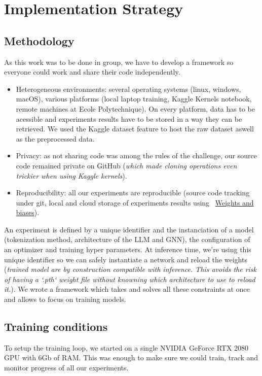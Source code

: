 \section{Implementation Strategy}
\label{sec:remplementation}
\subsection*{Methodology}
\label{sec:methodology}
As this work was to  be done in group, we have to develop a framework so everyone could work and share their code independently.
\begin{itemize}
    \item Heterogeneous environments: several operating systems (linux, windows, macOS), various platforms (local laptop training, Kaggle Kernels notebook, remote machines at Ecole Polytechnique). On every platform, data has to be acessible and experiments results have to be stored in a way they can be retrieved. We used the Kaggle dataset feature to  host the raw dataset aswell as the preprocessed data.
    \item Privacy: as not sharing code was among the rules of the challenge, our source code remained private on GitHub (\textit{which made cloning operations even trickier when using Kaggle kernels}).
    \item Reproducibility: all our experiments are reproducible (source code tracking under git, local and cloud storage of experiments results using ~\href{https://wandb.ai/molecule-nlp-altegrad-23/molecule-nlp}{Weights and biases}).
\end{itemize}
An experiment is defined by a unique identifier and the instanciation of a model (tokenization method, architecture of the LLM and GNN), the configuration of an  optimizer and training hyper parameters. At inference time, we're using this unique identifier so we can safely instantiate a network and reload the weights (\textit{trained model are by construction compatible with inference. This avoids the risk of having a `.pth` weight file without knowning which architecture to use to reload it.}).
We wrote a framework which takes and solves all these constraints at once and allows to focus on training models.


\subsection*{Training conditions}
\label{sec:training conditions}
To setup the training loop, we started on a single NVIDIA GeForce RTX 2080 GPU with 6Gb of RAM. This was enough to make sure we could train, track and monitor progress of all our experiments.


